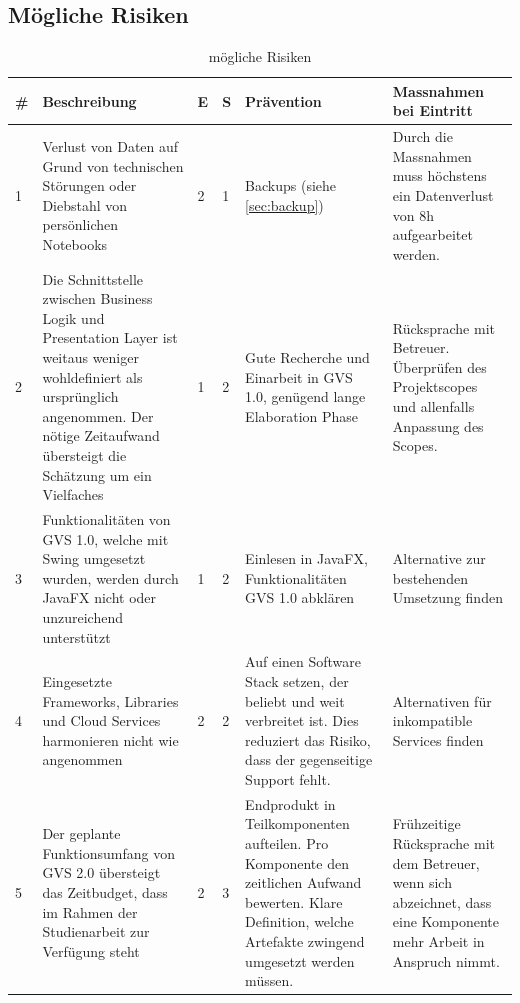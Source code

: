 \documentclass[11pt,a4paper,english,oneside]{book}
\numberwithin{equation}{chapter}
\begin{document}
	\begin{landscape}		
		\subsection{Mögliche Risiken}
			\begin{table}[h!]
			\centering
			\begin{tabularx}{\linewidth}{l X l l X X}
				\toprule 
				\# & Beschreibung & E & S & Prävention & Massnahmen bei Eintritt \\
				\toprule 
				1 & Verlust von Daten auf Grund von technischen Störungen oder Diebstahl von persönlichen Notebooks & 2 & 1 & Backups (siehe \ref{sec:backup}) & Durch die Massnahmen muss höchstens ein Datenverlust von 8h aufgearbeitet werden. \\
				\midrule
				2 & Die Schnittstelle zwischen Business Logik und Presentation Layer ist weitaus weniger wohldefiniert als ursprünglich angenommen. Der nötige Zeitaufwand übersteigt die Schätzung um ein Vielfaches & 1 & 2 & Gute Recherche und Einarbeit in GVS 1.0, genügend lange Elaboration Phase & Rücksprache mit Betreuer. Überprüfen des Projektscopes und allenfalls Anpassung des Scopes. \\
				\midrule
				3 & Funktionalitäten von GVS 1.0, welche mit Swing umgesetzt wurden, werden durch JavaFX nicht oder unzureichend unterstützt & 1 & 2 & Einlesen in JavaFX, Funktionalitäten GVS 1.0 abklären & Alternative zur bestehenden Umsetzung finden \\
				\midrule
				4 & Eingesetzte Frameworks, Libraries und Cloud Services harmonieren nicht wie angenommen & 2 & 2 & Auf einen Software Stack setzen, der beliebt und weit verbreitet ist. Dies reduziert das Risiko, dass der gegenseitige Support fehlt. & Alternativen für inkompatible Services finden \\  
				\midrule 
				5 & Der geplante Funktionsumfang von GVS 2.0 übersteigt das Zeitbudget, dass im Rahmen der Studienarbeit zur Verfügung steht & 2 & 3 & Endprodukt in Teilkomponenten aufteilen. Pro Komponente den zeitlichen Aufwand bewerten. Klare Definition, welche Artefakte zwingend umgesetzt werden müssen. & Frühzeitige Rücksprache mit dem Betreuer, wenn sich abzeichnet, dass eine Komponente mehr Arbeit in Anspruch nimmt. \\  
				\bottomrule 
			\end{tabularx} 
			\caption{mögliche Risiken} 
		\end{table}
    \end{landscape}
\end{document}
